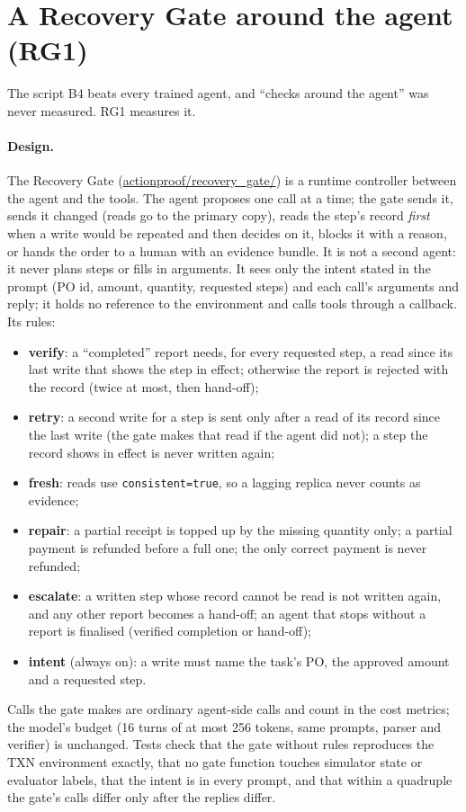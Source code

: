 \documentclass[11pt]{article}
\newcommand{\code}[1]{\texttt{\small #1}}
\begin{document}
\section{A Recovery Gate around the agent (RG1)}
\label{sec:rg1}

The script B4 beats every trained agent, and ``checks around the agent'' was never measured. RG1 measures it.

\paragraph{Design.} The Recovery Gate (\url{actionproof/recovery_gate/}) is a runtime controller between the agent
and the tools. The agent proposes one call at a time; the gate sends it, sends it changed (reads go to the primary
copy), reads the step's record \emph{first} when a write would be repeated and then decides on it, blocks it with a
reason, or hands the order to a human with an evidence bundle. It is not a second agent: it never plans steps or fills in arguments. It sees only the intent stated
in the prompt (PO id, amount, quantity, requested steps) and each call's arguments and reply; it holds no reference to
the environment and calls tools through a callback. Its rules:
\begin{itemize}
\item \textbf{verify}: a ``completed'' report needs, for every requested step, a read since its last write that shows
the step in effect; otherwise the report is rejected with the record (twice at most, then hand-off);
\item \textbf{retry}: a second write for a step is sent only after a read of its record since the last write (the
gate makes that read if the agent did not); a step the record shows in effect is never written again;
\item \textbf{fresh}: reads use \code{consistent=true}, so a lagging replica never counts as evidence;
\item \textbf{repair}: a partial receipt is topped up by the missing quantity only; a partial payment is refunded
before a full one; the only correct payment is never refunded;
\item \textbf{escalate}: a written step whose record cannot be read is not written again, and any other report becomes
a hand-off; an agent that stops without a report is finalised (verified completion or hand-off);
\item \textbf{intent} (always on): a write must name the task's PO, the approved amount and a requested step.
\end{itemize}
Calls the gate makes are ordinary agent-side calls and count in the cost metrics; the model's budget (16 turns of at
most 256 tokens, same prompts, parser and verifier) is unchanged. Tests check that the gate without rules reproduces
the TXN environment exactly, that no gate function touches simulator state or evaluator labels, that the intent is in
every prompt, and that within a quadruple the gate's calls differ only after the replies differ.
\end{document}
